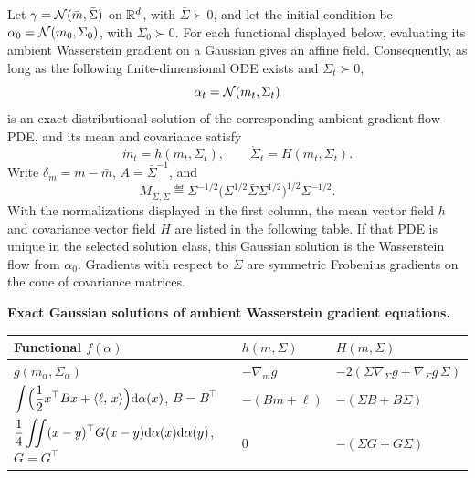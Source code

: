 \begin{prop}\label{prop-centered-gaussian-covariance-catalogue}
	Let \(\gamma=\mathcal{N}(\bar m,\bar\Sigma)\) on \(\mathbb{R}^d\), with \(\bar\Sigma\succ0\), and let the initial condition be \(\alpha_0=\mathcal{N}(m_0,\Sigma_0)\), with \(\Sigma_0\succ0\). For each functional displayed below, evaluating its ambient Wasserstein gradient on a Gaussian gives an affine field. Consequently, as long as the following finite-dimensional ODE exists and \(\Sigma_t\succ0\),
	\[
		\alpha_t=\mathcal{N}(m_t,\Sigma_t)
	\]
	is an exact distributional solution of the corresponding ambient gradient-flow PDE, and its mean and covariance satisfy
	\[
		\dot{m}_t=h(m_t,\Sigma_t),
		\qquad
		\dot{\Sigma}_t=H(m_t,\Sigma_t).
	\]
	Write \(\delta_m=m-\bar m\), \(A=\bar\Sigma^{-1}\), and
	\[
		M_{\Sigma,\bar\Sigma}
		\eqdef
		\Sigma^{-1/2}\bigl(\Sigma^{1/2}\bar\Sigma\Sigma^{1/2}\bigr)^{1/2}\Sigma^{-1/2}.
	\]
	With the normalizations displayed in the first column, the mean vector field \(h\) and covariance vector field \(H\) are listed in the following table. If that PDE is unique in the selected solution class, this Gaussian solution is the Wasserstein flow from \(\alpha_0\). Gradients with respect to \(\Sigma\) are symmetric Frobenius gradients on the cone of covariance matrices.
		\begin{center}
		\begingroup
		\small
		\renewcommand{\arraystretch}{1.55}
		\textbf{Exact Gaussian solutions of ambient Wasserstein gradient equations.}\par\smallskip
		\begin{tabularx}{\linewidth}{>{\raggedright\arraybackslash}p{.42\linewidth}>{\centering\arraybackslash}p{.18\linewidth}>{\raggedright\arraybackslash}X}
			\hline
			Functional \(f(\alpha)\) & \(h(m,\Sigma)\) & \(H(m,\Sigma)\) \\
			\hline
			\(g(m_\alpha,\Sigma_\alpha)\)
			&
			\(-\nabla_m g\)
			&
			\(-2(\Sigma\nabla_\Sigma g+\nabla_\Sigma g\,\Sigma)\)
			\\
			\(\displaystyle \int\Bigl(\frac12x^\top Bx+\langle \ell,\,x\rangle\Bigr)\mathrm{d}\alpha(x)\), \(B=B^\top\)
			&
			\(-(B m+\ell)\)
			&
			\(-(\Sigma B+B\Sigma)\)
			\\
			\(\displaystyle \frac14\iint (x-y)^\top G(x-y)\mathrm{d}\alpha(x)\mathrm{d}\alpha(y)\), \(G=G^\top\)
			&
			\(0\)
			&
			\(-(\Sigma G+G\Sigma)\)
			\\

\end{tabularx}
\end{center}
\end{prop}

